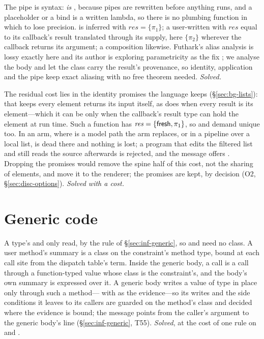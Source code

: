 The pipe is syntax:  \emph{is}
, because pipes are rewritten before anything runs, and a
placeholder or a  bind is a written lambda, so there is no plumbing function in which to lose
precision.  is inferred with $\mathit{res} = \{\pi_1\}$; a user-written
 with $\mathit{res}$ equal to its callback's result translated through its supply,
here $\{\pi_2\}$ wherever the callback returns its argument; a composition  likewise.
Futhark's alias analysis is lossy exactly here and its author is exploring parametricity as the fix
\citep{henriksen2026aliasing}; we analyse the body and let the class carry the result's provenance, so
identity, application and the pipe keep exact aliasing with no free theorem needed. \emph{Solved.}

The residual cost lies in the identity promises the language keeps (\S\ref{sec:bg-lists}): 
that keeps every element returns its input itself, as does  when every result is \code{===} its
element---which it can be only when the callback's result type can hold the element at run time. Such a
function has $\mathit{res} = \{\mathsf{fresh}, \pi_1\}$, so
 and  demand  unique too.
In an  arm, where  is a model path the arm replaces, or in a pipeline over a local
list,  is dead there and nothing is lost; a program that edits the filtered list and still reads
the source afterwards is rejected, and the message offers . Dropping the promises would
remove the spine half of this cost, not the sharing of elements, and move it to the renderer; the promises
are kept, by decision (O2, \S\ref{sec:disc-options}).
\emph{Solved with a cost.}

\section{Generic code}
\label{sec:hard-generic}

A type's  and  only read, by the rule of \S\ref{sec:inf-generic}, so
 and  need no class. A user method's summary is a class
on the constraint's method type, bound at each call site from the dispatch table's term. Inside the
generic body, a call  is a call through a function-typed value whose class is the
constraint's, and the body's own summary is expressed over it. A generic body writes a value of type
 in place only through such a method--- with  as the evidence---so
its writes and the side conditions it leaves to its callers are guarded on the method's class and decided
where the evidence is bound; the message points from the caller's argument to the generic body's line
(\S\ref{sec:inf-generic}, T55). \emph{Solved}, at the cost of one rule on  and .


